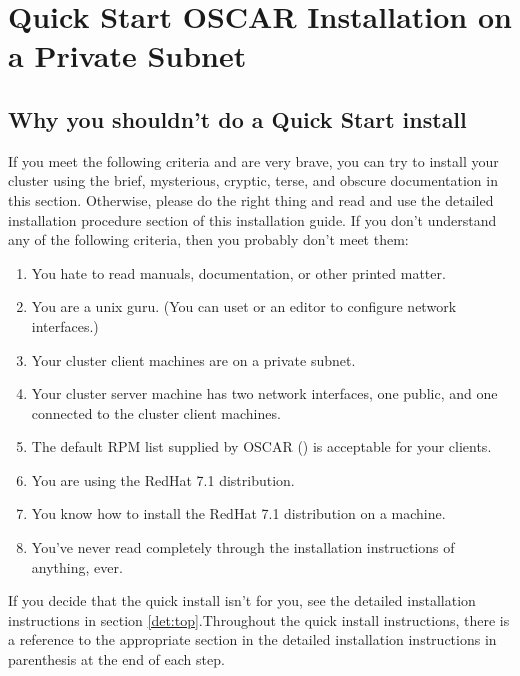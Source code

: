 %
%
%

\begchange
\section{Quick Start OSCAR Installation on a Private Subnet}


\subsection{Why you shouldn't do a Quick Start install}

If you meet the following criteria and are very brave, you can 
try to install your cluster using the brief, mysterious,
cryptic, terse, and obscure documentation in this section.  
Otherwise, please do the right thing and read and use the 
detailed installation procedure section of this installation guide.
If you don't understand any of the following criteria, 
then you probably don't meet them:

\begin{enumerate}
\item You hate to read manuals, documentation, or other printed matter.
\item You are a unix guru. (You can uset  or an editor to
  configure network interfaces.)
\item Your cluster client machines are on a private subnet.
\item Your cluster server machine has two network interfaces, one public,
  and one connected to the cluster client machines.
\item The default RPM list supplied by OSCAR
  () is
  acceptable for your clients.
\item You are using the RedHat 7.1 distribution.
\item You know how to install the RedHat 7.1 distribution on a machine.
\item You've never read completely through the installation instructions
  of anything, ever. 
\end{enumerate}

If you decide that the quick install isn't for you, see the detailed installation
instructions in section \ref{det:top}.Throughout the quick install instructions,
there is a reference to the appropriate section in the detailed installation 
instructions in parenthesis at the end of each step.

